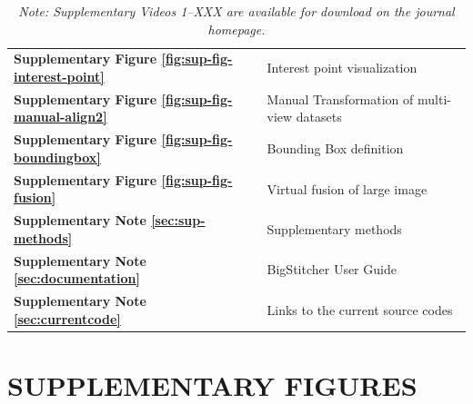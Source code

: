 \documentclass[]{spie}  %
\newcommand\tablespace{\vspace{2.5mm}}
\begin{document}
\begin{table}[h!]
{\begin{tabular}{lp{11cm}}
\textbf{Supplementary Figure \ref{fig:sup-fig-interest-point}} & Interest point visualization \tablespace \\
\textbf{Supplementary Figure \ref{fig:sup-fig-manual-align2}} & Manual Transformation of multi-view datasets \tablespace \\
\textbf{Supplementary Figure \ref{fig:sup-fig-boundingbox}} & Bounding Box definition \tablespace \\
\textbf{Supplementary Figure \ref{fig:sup-fig-fusion}} & Virtual fusion of large image \tablespace \\
\textbf{Supplementary Note \ref{sec:sup-methods}} & Supplementary methods \tablespace \\
\textbf{Supplementary Note \ref{sec:documentation}} & BigStitcher User Guide \tablespace \\
\textbf{Supplementary Note \ref{sec:currentcode}} & Links to the current source codes \tablespace \\

\end{tabular}}
\caption{\emph{Note: Supplementary Videos 1--XXX are available for download on the journal homepage.}}
\end{table}

\pagebreak

\section*{SUPPLEMENTARY FIGURES}
\end{document}
